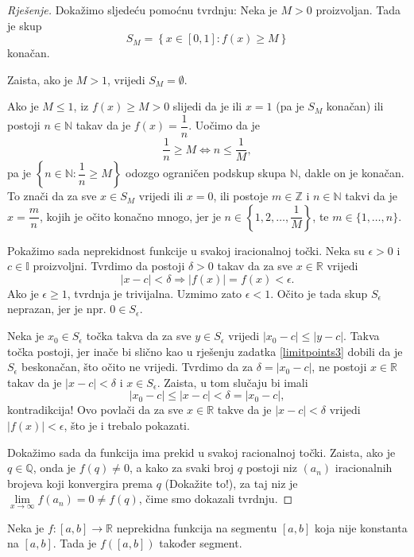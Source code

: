 \begin{proof}[Rješenje]
Dokažimo sljedeću pomoćnu tvrdnju: Neka je \(M>0\) proizvoljan. Tada je skup
\[S_M=\left\{x\in[0, 1] : f(x)\geq M\right\}\]
konačan. 

Zaista, ako je \(M>1\), vrijedi \(S_M=\emptyset\). 

Ako je \(M\leq 1\), iz \(f(x)\geq M>0\) slijedi da je ili \(x=1\) (pa je \(S_M\) konačan) ili postoji \(n\in \mathbb{N}\) takav da je \(f(x)=\dfrac{1}{n}\). Uočimo da je \[\dfrac{1}{n}\geq M\Longleftrightarrow n\leq \dfrac{1}{M},\] pa je \(\left\{n\in \mathbb{N} : \dfrac{1}{n}\geq M\right\}\) odozgo ograničen podskup skupa \(\mathbb{N}\), dakle on je konačan. To znači da za sve \(x\in S_M\) vrijedi ili \(x=0\), ili postoje \(m\in \mathbb{Z}\) i \(n\in \mathbb{N}\) takvi da je \(x=\dfrac{m}{n}\), kojih je očito konačno mnogo, jer je \(n\in \left\{1, 2,\dots, \dfrac{1}{M}\right\}\), te \(m\in \{1, \dots, n\}\).

Pokažimo sada neprekidnost funkcije u svakoj iracionalnoj točki. Neka su \(\epsilon>0\) i \(c\in \mathbb{I}\) proizvoljni. Tvrdimo da postoji \(\delta>0\) takav da za sve \(x\in \mathbb{R}\) vrijedi \[|x-c|<\delta\Rightarrow |f(x)|=f(x)<\epsilon.\] 
Ako je \(\epsilon\geq 1\), tvrdnja je trivijalna. Uzmimo zato \(\epsilon<1\). Očito je tada skup \(S_\epsilon\) neprazan, jer je npr. \(0\in S_\epsilon\).

Neka je \(x_0\in S_\epsilon\) točka takva da za sve \(y\in S_\epsilon\) vrijedi \(|x_0-c|\leq|y-c|\). Takva točka postoji, jer inače bi slično kao u rješenju zadatka \ref{limitpoints3} dobili da je \(S_\epsilon\) beskonačan, što očito ne vrijedi. Tvrdimo da za \(\delta=|x_0-c|\), ne postoji \(x\in \mathbb{R}\) takav da je \(|x-c|<\delta\) i \(x\in S_\epsilon\). Zaista, u tom slučaju bi imali \[|x_0-c|\leq |x-c|<\delta=|x_0-c|,\] kontradikcija! Ovo povlači da za sve \(x\in \mathbb{R}\) takve da je \(|x-c|<\delta\) vrijedi \(|f(x)|<\epsilon\), što je i trebalo pokazati.

Dokažimo sada da funkcija ima prekid u svakoj racionalnoj točki. Zaista, ako je \(q\in \mathbb{Q}\), onda je \(f(q)\neq 0\), a kako za svaki broj \(q\) postoji niz \((a_n)\) iracionalnih brojeva koji konvergira prema \(q\) (Dokažite to!), za taj niz je \(\lim\limits_{x\to \infty}{f(a_n)}=0\neq f(q)\), čime smo dokazali tvrdnju.
\end{proof}
\begin{remark}
Neka je \(f : [a, b]\to \mathbb{R}\) neprekidna funkcija na segmentu \([a, b]\) koja nije konstanta na $[a, b]$. Tada je \(f([a, b])\) također segment.
\end{remark}
